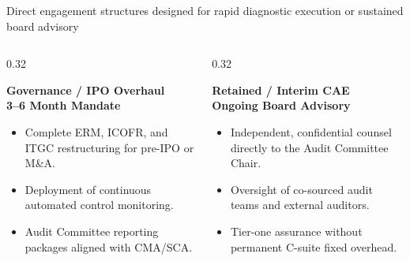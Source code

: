 \documentclass[aspectratio=169, 8pt]{beamer}
\begin{document}
\begin{frame}{Direct engagement structures designed for rapid diagnostic execution or sustained board advisory}
\begin{columns}[T]
        \begin{column}{0.32\textwidth}
            \begin{tcolorbox}[colback=cardBg, colframe=cardBorder, arc=1pt, boxrule=0.5pt, left=4pt, right=4pt, top=3pt, bottom=3pt]
                \textbf{\small \color{obsidian} Governance / IPO Overhaul} \\
                \vspace{0.05cm}
                \textbf{\scriptsize \color{terracotta} 3--6 Month Mandate}
            \end{tcolorbox}
            \begin{itemize}
                \setlength{\itemsep}{2pt}
                \item Complete ERM, ICOFR, and ITGC restructuring for pre-IPO or M\&A.
                \item Deployment of continuous automated control monitoring.
                \item Audit Committee reporting packages aligned with CMA/SCA.
            \end{itemize}
        \end{column}
        
        \begin{column}{0.32\textwidth}
            \begin{tcolorbox}[colback=cardBg, colframe=cardBorder, arc=1pt, boxrule=0.5pt, left=4pt, right=4pt, top=3pt, bottom=3pt]
                \textbf{\small \color{obsidian} Retained / Interim CAE} \\
                \vspace{0.05cm}
                \textbf{\scriptsize \color{terracotta} Ongoing Board Advisory}
            \end{tcolorbox}
            \begin{itemize}
                \setlength{\itemsep}{2pt}
                \item Independent, confidential counsel directly to the Audit Committee Chair.
                \item Oversight of co-sourced audit teams and external auditors.
                \item Tier-one assurance without permanent C-suite fixed overhead.
            \end{itemize}
        \end{column}
    \end{columns}
    

\end{frame}
\end{document}
